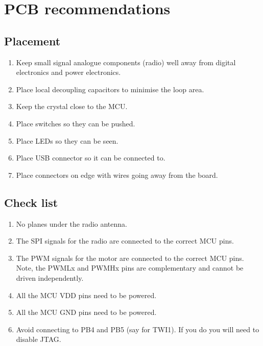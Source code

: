 \section{PCB recommendations}\label{pcb-recommendations}

\subsection{Placement}\label{placement}

\begin{enumerate}
\item
  Keep small signal analogue components (radio) well away from digital
  electronics and power electronics.
\item
  Place local decoupling capacitors to minimise the loop area.
\item
  Keep the crystal close to the MCU.
\item
  Place switches so they can be pushed.
\item
  Place LEDs so they can be seen.
\item
  Place USB connector so it can be connected to.
\item
  Place connectors on edge with wires going away from the board.
\end{enumerate}

\subsection{Check list}\label{check-list}

\begin{enumerate}
\item
  No planes under the radio antenna.
\item
  The SPI signals for the radio are connected to the correct MCU pins.
\item
  The PWM signals for the motor are connected to the correct MCU pins.
  Note, the PWMLx and PWMHx pins are complementary and cannot be driven
  independently.
\item
  All the MCU VDD pins need to be powered.
\item
  All the MCU GND pins need to be powered.
\item
  Avoid connecting to PB4 and PB5 (say for TWI1).  If you do you will need to disable JTAG.
\end{enumerate}

